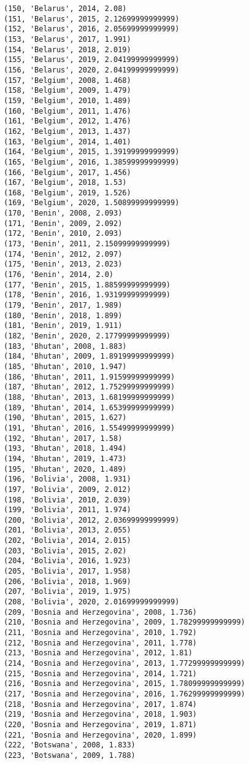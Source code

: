 \documentclass[11pt]{article}
\begin{document}
\begin{Verbatim}[commandchars=\\\{\}]
(150, 'Belarus', 2014, 2.08)
(151, 'Belarus', 2015, 2.12699999999999)
(152, 'Belarus', 2016, 2.05699999999999)
(153, 'Belarus', 2017, 1.991)
(154, 'Belarus', 2018, 2.019)
(155, 'Belarus', 2019, 2.04199999999999)
(156, 'Belarus', 2020, 2.04199999999999)
(157, 'Belgium', 2008, 1.468)
(158, 'Belgium', 2009, 1.479)
(159, 'Belgium', 2010, 1.489)
(160, 'Belgium', 2011, 1.476)
(161, 'Belgium', 2012, 1.476)
(162, 'Belgium', 2013, 1.437)
(163, 'Belgium', 2014, 1.401)
(164, 'Belgium', 2015, 1.39199999999999)
(165, 'Belgium', 2016, 1.38599999999999)
(166, 'Belgium', 2017, 1.456)
(167, 'Belgium', 2018, 1.53)
(168, 'Belgium', 2019, 1.526)
(169, 'Belgium', 2020, 1.50899999999999)
(170, 'Benin', 2008, 2.093)
(171, 'Benin', 2009, 2.092)
(172, 'Benin', 2010, 2.093)
(173, 'Benin', 2011, 2.15099999999999)
(174, 'Benin', 2012, 2.097)
(175, 'Benin', 2013, 2.023)
(176, 'Benin', 2014, 2.0)
(177, 'Benin', 2015, 1.88599999999999)
(178, 'Benin', 2016, 1.93199999999999)
(179, 'Benin', 2017, 1.989)
(180, 'Benin', 2018, 1.899)
(181, 'Benin', 2019, 1.911)
(182, 'Benin', 2020, 2.17799999999999)
(183, 'Bhutan', 2008, 1.883)
(184, 'Bhutan', 2009, 1.89199999999999)
(185, 'Bhutan', 2010, 1.947)
(186, 'Bhutan', 2011, 1.91599999999999)
(187, 'Bhutan', 2012, 1.75299999999999)
(188, 'Bhutan', 2013, 1.68199999999999)
(189, 'Bhutan', 2014, 1.65399999999999)
(190, 'Bhutan', 2015, 1.627)
(191, 'Bhutan', 2016, 1.55499999999999)
(192, 'Bhutan', 2017, 1.58)
(193, 'Bhutan', 2018, 1.494)
(194, 'Bhutan', 2019, 1.473)
(195, 'Bhutan', 2020, 1.489)
(196, 'Bolivia', 2008, 1.931)
(197, 'Bolivia', 2009, 2.012)
(198, 'Bolivia', 2010, 2.039)
(199, 'Bolivia', 2011, 1.974)
(200, 'Bolivia', 2012, 2.03699999999999)
(201, 'Bolivia', 2013, 2.055)
(202, 'Bolivia', 2014, 2.015)
(203, 'Bolivia', 2015, 2.02)
(204, 'Bolivia', 2016, 1.923)
(205, 'Bolivia', 2017, 1.958)
(206, 'Bolivia', 2018, 1.969)
(207, 'Bolivia', 2019, 1.975)
(208, 'Bolivia', 2020, 2.01699999999999)
(209, 'Bosnia and Herzegovina', 2008, 1.736)
(210, 'Bosnia and Herzegovina', 2009, 1.78299999999999)
(211, 'Bosnia and Herzegovina', 2010, 1.792)
(212, 'Bosnia and Herzegovina', 2011, 1.778)
(213, 'Bosnia and Herzegovina', 2012, 1.81)
(214, 'Bosnia and Herzegovina', 2013, 1.77299999999999)
(215, 'Bosnia and Herzegovina', 2014, 1.721)
(216, 'Bosnia and Herzegovina', 2015, 1.78099999999999)
(217, 'Bosnia and Herzegovina', 2016, 1.76299999999999)
(218, 'Bosnia and Herzegovina', 2017, 1.874)
(219, 'Bosnia and Herzegovina', 2018, 1.903)
(220, 'Bosnia and Herzegovina', 2019, 1.871)
(221, 'Bosnia and Herzegovina', 2020, 1.899)
(222, 'Botswana', 2008, 1.833)
(223, 'Botswana', 2009, 1.788)

\end{Verbatim}
\end{document}
